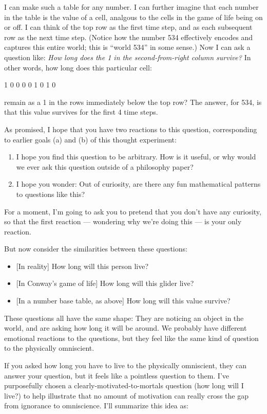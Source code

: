 \documentclass[11pt, oneside]{article}   	%
\begin{document}
I can make such a table for any number.
I can further imagine that each number in the table is the value of a cell,
analgous to the cells in the game of life being on or off.
I can think of the
top row as the first time step, and as each subsequent row as the next time
step.
(Notice how the number 534 effectively encodes and captures this entire
world; this is ``world 534'' in some sense.)
Now I can ask a question like:
{\em How long does the 1 in the second-from-right column survive?}
In other words, how long does this particular cell:
\begin{center}
    1 0 0 0 0 1 0 1  0
\end{center}
remain as a 1 in the rows immediately below the top row?
The answer, for 534, is that this value survives for the first 4
time steps.

As promised, I hope that you have two reactions to this question, corresponding
to earlier goals (a) and (b) of this thought experiment:
\begin{enumerate}
    \item I hope you find this question to be arbitrary. How is it useful, or
        why would we ever ask this question outside of a philosophy paper?
    \item I hope you wonder:
        Out of curiosity, are there any fun mathematical patterns to questions
        like this?
\end{enumerate}
For a moment, I'm going to ask you to pretend that you don't have any curiosity,
so that the first reaction --- wondering why we're doing this --- is your only
reaction.

But now consider the similarities between these questions:
\begin{itemize}
    \item{} [In reality] How long will this person live?
    \item{} [In Conway's game of life] How long will this glider live?
    \item{} [In a number base table, as above] How long will this value survive?
\end{itemize}
These questions all have the same shape: They are noticing an
object in the world, and are asking how long it will be around.
We probably have different emotional reactions to the questions, but they feel
like the same kind of question to the physically omniscient.

If you asked how long you have to live to the physically omniscient, they can
answer your question, but it feels like a pointless question to them. I've
purposefully chosen a clearly-motivated-to-mortals question (how long will I
live?) to help illustrate
that no amount of motivation can really cross the gap from ignorance to
omniscience. I'll summarize this idea as:
\end{document}
